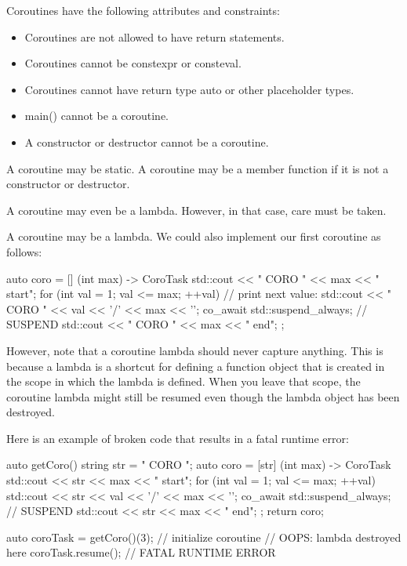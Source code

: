 
Coroutines have the following attributes and constraints:

\begin{itemize}
\item 
Coroutines are not allowed to have return statements.

\item 
Coroutines cannot be constexpr or consteval.

\item 
Coroutines cannot have return type auto or other placeholder types.

\item 
main() cannot be a coroutine.

\item 
A constructor or destructor cannot be a coroutine.
\end{itemize}

A coroutine may be static. A coroutine may be a member function if it is not a constructor or destructor.

A coroutine may even be a lambda. However, in that case, care must be taken.


A coroutine may be a lambda. We could also implement our first coroutine as follows:

\begin{cpp}
auto coro = [] (int max) -> CoroTask {
				std::cout << "          CORO " << max << " start\n";
				for (int val = 1; val <= max; ++val) {
					// print next value:
					std::cout << " CORO " << val << '/' << max << '\n';
					co_await std::suspend_always{}; // SUSPEND
				}
				std::cout << "         CORO " << max << " end\n";
};
\end{cpp}

However, note that a coroutine lambda should never capture anything. This is because a lambda is a shortcut for defining a function object that is created in the scope in which the lambda is defined. When you leave that scope, the coroutine lambda might still be resumed even though the lambda object has been destroyed.

Here is an example of broken code that results in a fatal runtime error:

\begin{cpp}
auto getCoro()
{
	string str = "      CORO ";
	auto coro = [str] (int max) -> CoroTask {
				std::cout << str << max << " start\n";
				for (int val = 1; val <= max; ++val) {
					std::cout << str << val << '/' << max << '\n';
					co_await std::suspend_always{}; // SUSPEND
				}
				std::cout << str << max << " end\n";
			};
	return coro;
}

auto coroTask = getCoro()(3); // initialize coroutine
// OOPS: lambda destroyed here
coroTask.resume(); // FATAL RUNTIME ERROR
\end{cpp}

